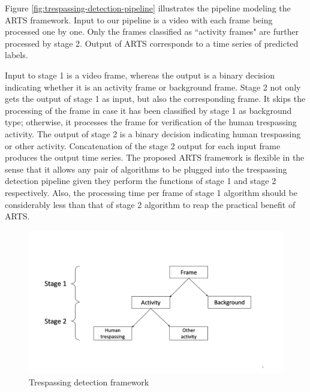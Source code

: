 Figure \ref{fig:trespassing-detection-pipeline} illustrates the pipeline modeling the ARTS framework.
Input to our pipeline is a video with each frame being processed one by one. Only the frames classified as  ``activity frames" are further processed by stage 2. Output of ARTS corresponds to a time series of predicted labels.

Input to stage 1 is a video frame, whereas the output is a binary decision indicating whether it is an activity frame or background frame. Stage 2 not only gets the output of stage 1 as input, but also the corresponding frame. It skips the processing of the frame in case it has been classified by stage 1 as background type; otherwise, it processes the frame for verification of the human trespassing activity. The output of stage 2 is a binary decision indicating human trespassing or other activity. Concatenation of the stage 2 output for each input frame produces the output time series. The proposed ARTS framework is flexible in the sense that it allows any pair of algorithms to be plugged into the trespassing detection pipeline given they perform the functions of stage 1 and stage 2 respectively. Also, the processing time per frame of stage 1 algorithm should be considerably less than that of stage 2 algorithm to reap the practical benefit of ARTS. 

\begin{figure}
    \centering
    \includegraphics[width=\linewidth,trim={50 110 50 130},clip]{images/trespassing-detection-framework}
    \caption{Trespassing detection framework}
    \label{fig:trespassing-detection-framework}
\end{figure}


